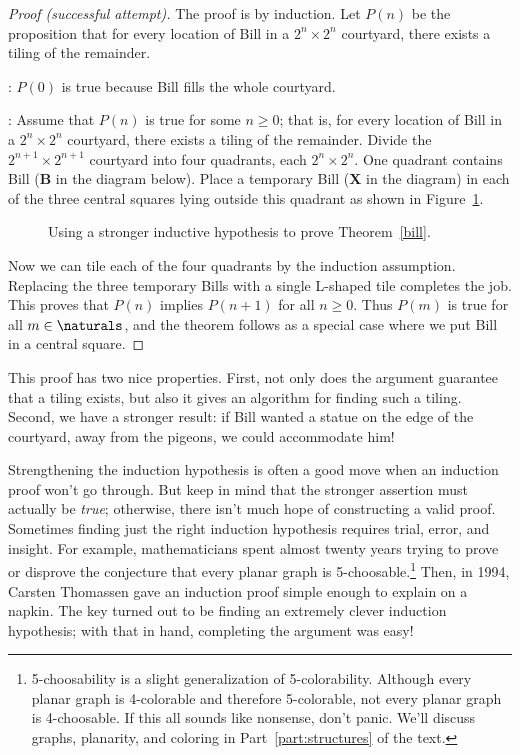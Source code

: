 \begin{proof}[Proof (successful attempt)]
The proof is by induction.  Let $P(n)$ be the proposition that for
every location of Bill in a $2^n \times 2^n$ courtyard, there exists a
tiling of the remainder.

: $P(0)$ is true because Bill fills the
whole courtyard.

: Assume that $P(n)$ is true for some
$n \geq 0$; that is, for every location of Bill in a $2^n \times 2^n$
courtyard, there exists a tiling of the remainder.  Divide the
$2^{n+1} \times 2^{n+1}$ courtyard into four quadrants, each $2^n
\times 2^n$.  One quadrant contains Bill (\textbf{B} in the diagram
below).  Place a temporary Bill (\textbf{X} in the diagram) in each of
the three central squares lying outside this quadrant as shown in
Figure~\ref{fig:stronger-bill}.

\begin{figure}


\caption{Using a stronger inductive hypothesis to prove
  Theorem~\ref{bill}.}
\label{fig:stronger-bill}
\end{figure}

Now we can tile each of the four quadrants by the induction
assumption.  Replacing the three temporary Bills with a single
L-shaped tile completes the job.  This proves that $P(n)$ implies
$P(n+1)$ for all $n \geq 0$.  Thus $P(m)$ is true for all $m \in
\naturals$, and the theorem follows as a special case where we put
Bill in a central square.
\end{proof}

This proof has two nice properties.  First, not only does the argument
guarantee that a tiling exists, but also it gives an algorithm for
finding such a tiling.  Second, we have a stronger result: if Bill
wanted a statue on the edge of the courtyard, away from the pigeons,
we could accommodate him!

Strengthening the induction hypothesis is often a good move when an
induction proof won't go through.  But keep in mind that the stronger
assertion must actually be \emph{true}; otherwise, there isn't much
hope of constructing a valid proof.  Sometimes finding just the right
induction hypothesis requires trial, error, and insight.  For example,
mathematicians spent almost twenty years trying to prove or disprove
the conjecture that every planar graph is
5-choosable.\footnote{5-choosability is a slight generalization
  of 5-colorability.  Although every planar graph is 4-colorable and
  therefore 5-colorable, not every planar graph is 4-choosable.  If
  this all sounds like nonsense, don't panic.  We'll discuss graphs,
  planarity, and coloring in Part~\ref{part:structures} of the text.}
Then, in 1994, Carsten Thomassen gave an induction proof simple enough
to explain on a napkin.  The key turned out to be finding an extremely
clever induction hypothesis; with that in hand, completing the
argument was easy!

